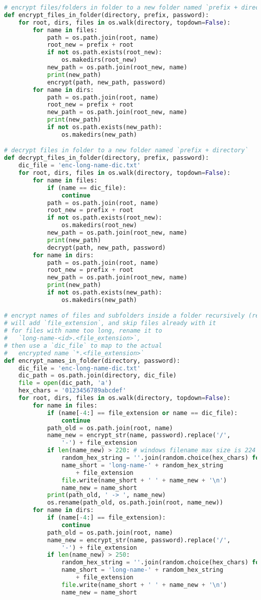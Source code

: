 \begin{lstlisting}[language=python,caption=encrypt.py]
# encrypt files/folders in folder to a new folder named `prefix + directory`
def encrypt_files_in_folder(directory, prefix, password):
	for root, dirs, files in os.walk(directory, topdown=False):
		for name in files:
			path = os.path.join(root, name)
			root_new = prefix + root
			if not os.path.exists(root_new):
				os.makedirs(root_new)
			new_path = os.path.join(root_new, name)
			print(new_path)
			encrypt(path, new_path, password)
		for name in dirs:
			path = os.path.join(root, name)
			root_new = prefix + root
			new_path = os.path.join(root_new, name)
			print(new_path)
			if not os.path.exists(new_path):
				os.makedirs(new_path)

# decrypt files in folder to a new folder named `prefix + directory`
def decrypt_files_in_folder(directory, prefix, password):
	dic_file = 'enc-long-name-dic.txt'
	for root, dirs, files in os.walk(directory, topdown=False):
		for name in files:
			if (name == dic_file):
				continue
			path = os.path.join(root, name)
			root_new = prefix + root
			if not os.path.exists(root_new):
				os.makedirs(root_new)
			new_path = os.path.join(root_new, name)
			print(new_path)
			decrypt(path, new_path, password)
		for name in dirs:
			path = os.path.join(root, name)
			root_new = prefix + root
			new_path = os.path.join(root_new, name)
			print(new_path)
			if not os.path.exists(new_path):
				os.makedirs(new_path)

# encrypt names of files and subfolders inside a folder recursively (rename)
# will add `file_extension`, and skip files already with it
# for files with name too long, rename it to
#   `long-name-<id>.<file_extension>`,
# then use a `dic_file` to map to the actual
#   encrypted name `*.<file_extension>`
def encrypt_names_in_folder(directory, password):
	dic_file = 'enc-long-name-dic.txt'
	dic_path = os.path.join(directory, dic_file)
	file = open(dic_path, 'a')
	hex_chars = '0123456789abcdef'
	for root, dirs, files in os.walk(directory, topdown=False):
		for name in files:
			if (name[-4:] == file_extension or name == dic_file):
				continue
			path_old = os.path.join(root, name)
			name_new = encrypt_str(name, password).replace('/',
				'-') + file_extension
			if len(name_new) > 220: # windows filename max size is 224
				random_hex_string = ''.join(random.choice(hex_chars) for _ in range(32))
				name_short = 'long-name-' + random_hex_string
					+ file_extension
				file.write(name_short + ' ' + name_new + '\n')
				name_new = name_short
			print(path_old, ' -> ', name_new)
			os.rename(path_old, os.path.join(root, name_new))
		for name in dirs:
			if (name[-4:] == file_extension):
				continue
			path_old = os.path.join(root, name)
			name_new = encrypt_str(name, password).replace('/',
				'-') + file_extension
			if len(name_new) > 250:
				random_hex_string = ''.join(random.choice(hex_chars) for _ in range(32))
				name_short = 'long-name-' + random_hex_string
					+ file_extension
				file.write(name_short + ' ' + name_new + '\n')
				name_new = name_short
				

\end{lstlisting}

